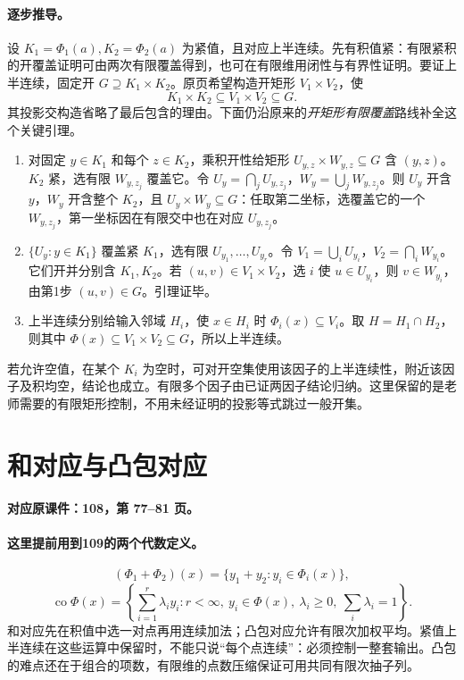 \documentclass[11pt,a4paper]{article}
\DeclareMathOperator{\conv}{co}\DeclareMathOperator{\cl}{cl}
\theoremstyle{definition}\newtheorem{definition}{定义}\newtheorem{example}{例}
\begin{document}
\paragraph{逐步推导。}
设 $K_1=\Phi_1(a),K_2=\Phi_2(a)$ 为紧值，且对应上半连续。先有积值紧：有限紧积的开覆盖证明可由两次有限覆盖得到，也可在有限维用闭性与有界性证明。要证上半连续，固定开 $G\supseteq K_1\times K_2$。原页希望构造开矩形 $V_1\times V_2$，使
\[K_1\times K_2\subseteq V_1\times V_2\subseteq G.\]
其投影交构造省略了最后包含的理由。下面仍沿原来的\emph{开矩形有限覆盖}路线补全这个关键引理。
\begin{enumerate}
\item 对固定 $y\in K_1$ 和每个 $z\in K_2$，乘积开性给矩形 $U_{y,z}\times W_{y,z}\subseteq G$ 含 $(y,z)$。$K_2$ 紧，选有限 $W_{y,z_j}$ 覆盖它。令 $U_y=\bigcap_jU_{y,z_j}$，$W_y=\bigcup_jW_{y,z_j}$。则 $U_y$ 开含 $y$，$W_y$ 开含整个 $K_2$，且 $U_y\times W_y\subseteq G$：任取第二坐标，选覆盖它的一个 $W_{y,z_j}$，第一坐标因在有限交中也在对应 $U_{y,z_j}$。
\item $\{U_y:y\in K_1\}$ 覆盖紧 $K_1$，选有限 $U_{y_1},\ldots,U_{y_r}$。令 $V_1=\bigcup_iU_{y_i}$，$V_2=\bigcap_iW_{y_i}$。它们开并分别含 $K_1,K_2$。若 $(u,v)\in V_1\times V_2$，选 $i$ 使 $u\in U_{y_i}$，则 $v\in W_{y_i}$，由第1步 $(u,v)\in G$。引理证毕。
\item 上半连续分别给输入邻域 $H_i$，使 $x\in H_i$ 时 $\Phi_i(x)\subseteq V_i$。取 $H=H_1\cap H_2$，则其中 $\Phi(x)\subseteq V_1\times V_2\subseteq G$，所以上半连续。
\end{enumerate}
若允许空值，在某个 $K_i$ 为空时，可对开空集使用该因子的上半连续性，附近该因子及积均空，结论也成立。有限多个因子由已证两因子结论归纳。这里保留的是老师需要的有限矩形控制，不用未经证明的投影等式跳过一般开集。


\clearpage\section{和对应与凸包对应}\label{g:108:77}

\textbf{对应原课件：108，第 77--81 页。}


\paragraph{这里提前用到109的两个代数定义。}
\[(\Phi_1+\Phi_2)(x)=\{y_1+y_2:y_i\in\Phi_i(x)\},\]
\[\conv\Phi(x)=\left\{\sum_{i=1}^r\lambda_i y_i:
 r<\infty,\ y_i\in\Phi(x),\ \lambda_i\ge0,\ \sum_i\lambda_i=1\right\}.
\]
和对应先在积值中选一对点再用连续加法；凸包对应允许有限次加权平均。紧值上半连续在这些运算中保留时，不能只说“每个点连续”：必须控制一整套输出。凸包的难点还在于组合的项数，有限维的点数压缩保证可用共同有限次抽子列。
\end{document}
